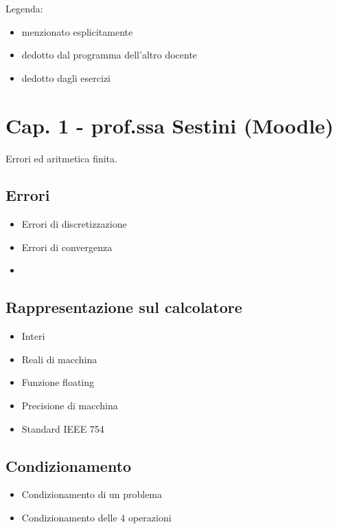 \documentclass[a4paper, 12pt]{article}
\begin{document}
\noindent Legenda:
	\begin{itemize}
		\item menzionato esplicitamente
		\color{blue} \item{dedotto dal programma dell'altro docente}
		\color{green} \item {dedotto dagli esercizi}
	\end{itemize}

\section{Cap. 1 - prof.ssa Sestini (Moodle)}

Errori ed aritmetica finita.

\subsection{Errori}

	\begin{itemize}
		\item Errori di discretizzazione
		\item Errori di convergenza
		\item \color{blue}{Errori di round-off}
	\end{itemize}

\subsection{Rappresentazione sul calcolatore}

	\begin{itemize}
		\item Interi
		\item Reali di macchina
		\item Funzione floating
		\item Precisione di macchina
		\item Standard IEEE 754
	\end{itemize}

\subsection{Condizionamento}

	\begin{itemize}
		\item Condizionamento di un problema
		\item Condizionamento delle 4 operazioni
	\end{itemize}
\end{document}
